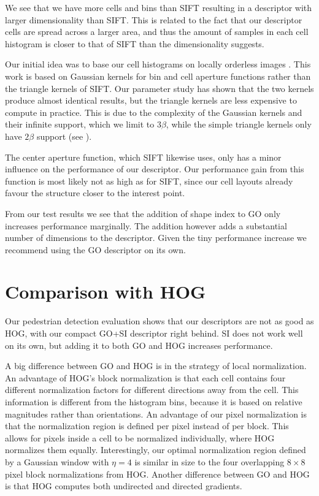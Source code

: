 \documentclass[thesis.tex]{subfiles}
\begin{document}
We see that we have more cells and bins than SIFT resulting in a descriptor with larger dimensionality than SIFT. This is related to the fact that our descriptor cells are spread across a larger area, and thus the amount of samples in each cell histogram is closer to that of SIFT than the dimensionality suggests.

Our initial idea was to base our cell histograms on locally orderless images \cite{koenderink1999structure}. This work is based on Gaussian kernels for bin and cell aperture functions rather than the triangle kernels of SIFT. Our parameter study has shown that the two kernels produce almost identical results, but the triangle kernels are less expensive to compute in practice. This is due to the complexity of the Gaussian kernels and their infinite support, which we limit to 3$\beta$, while the simple triangle kernels only have $2\beta$ support (see ).

The center aperture function, which SIFT likewise uses, only has a minor influence on the performance of our descriptor. Our performance gain from this function is most likely not as high as for SIFT, since our cell layouts already favour the structure closer to the interest point.

From our test results we see that the addition of shape index to GO only increases performance marginally. The addition however adds a substantial number of dimensions to the descriptor.
Given the tiny performance increase we recommend using the GO descriptor on its own.

\section{Comparison with HOG}

Our pedestrian detection evaluation shows that our descriptors are not as good as HOG, with our compact GO+SI descriptor right behind. SI does not work well on its own, but adding it to both GO and HOG increases performance.

A big difference between GO and HOG is in the strategy of local normalization. An advantage of HOG's block normalization is that each cell contains four different normalization factors for different directions away from the cell. This information is different from the histogram bins, because it is based on relative magnitudes rather than orientations. An advantage of our pixel normalization is that the normalization region is defined per pixel instead of per block. This allows for pixels inside a cell to be normalized individually, where HOG normalizes them equally. Interestingly, our optimal normalization region defined by a Gaussian window with $\eta = 4$ is similar in size to the four overlapping $8 \times 8$ pixel block normalizations from HOG. Another difference between GO and HOG is that HOG computes both undirected and directed gradients.
\end{document}

